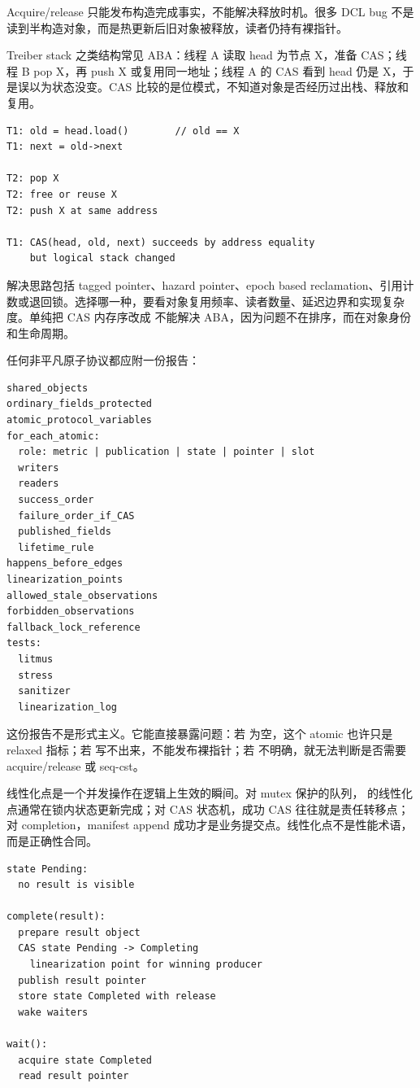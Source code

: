 Acquire/release 只能发布构造完成事实，不能解决释放时机。很多 DCL bug 不是读到半构造对象，而是热更新后旧对象被释放，读者仍持有裸指针。

Treiber stack 之类结构常见 ABA：线程 A 读取 head 为节点 X，准备 CAS；线程 B pop X，再 push X 或复用同一地址；线程 A 的 CAS 看到 head 仍是 X，于是误以为状态没变。CAS 比较的是位模式，不知道对象是否经历过出栈、释放和复用。

\begin{lstlisting}[numbers=none,caption={ABA 的时间线}]
T1: old = head.load()        // old == X
T1: next = old->next

T2: pop X
T2: free or reuse X
T2: push X at same address

T1: CAS(head, old, next) succeeds by address equality
    but logical stack changed
\end{lstlisting}

解决思路包括 tagged pointer、hazard pointer、epoch based reclamation、引用计数或退回锁。选择哪一种，要看对象复用频率、读者数量、延迟边界和实现复杂度。单纯把 CAS 内存序改成  不能解决 ABA，因为问题不在排序，而在对象身份和生命周期。

任何非平凡原子协议都应附一份报告：

\begin{lstlisting}[numbers=none,caption={MemoryModelReport 最小字段}]
shared_objects
ordinary_fields_protected
atomic_protocol_variables
for_each_atomic:
  role: metric | publication | state | pointer | slot
  writers
  readers
  success_order
  failure_order_if_CAS
  published_fields
  lifetime_rule
happens_before_edges
linearization_points
allowed_stale_observations
forbidden_observations
fallback_lock_reference
tests:
  litmus
  stress
  sanitizer
  linearization_log
\end{lstlisting}

这份报告不是形式主义。它能直接暴露问题：若  为空，这个 atomic 也许只是 relaxed 指标；若  写不出来，不能发布裸指针；若  不明确，就无法判断是否需要 acquire/release 或 seq-cst。

线性化点是一个并发操作在逻辑上生效的瞬间。对 mutex 保护的队列， 的线性化点通常在锁内状态更新完成；对 CAS 状态机，成功 CAS 往往就是责任转移点；对 completion，manifest append 成功才是业务提交点。线性化点不是性能术语，而是正确性合同。

\begin{lstlisting}[numbers=none,caption={TaskCompletion 的线性化点账本}]
state Pending:
  no result is visible

complete(result):
  prepare result object
  CAS state Pending -> Completing
    linearization point for winning producer
  publish result pointer
  store state Completed with release
  wake waiters

wait():
  acquire state Completed
  read result pointer
\end{lstlisting}

